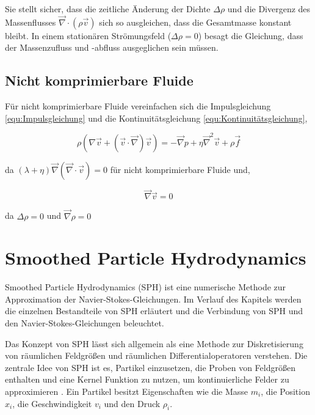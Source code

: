\documentclass[a4paper, 12pt]{article}
\begin{document}
Sie stellt sicher, dass die zeitliche Änderung der Dichte \(\Delta \rho\) und die Divergenz des Massenflusses \(\vec{\nabla} \cdot (\rho \vec{v})\) sich so ausgleichen, dass die Gesamtmasse konstant bleibt. In einem stationären Strömungsfeld (\(\Delta \rho = 0\)) besagt die Gleichung, dass der Massenzufluss und -abfluss ausgeglichen sein müssen.

\subsection{Nicht komprimierbare Fluide}
Für nicht komprimierbare Fluide vereinfachen sich die Impulsgleichung \eqref{equ:Impulsgleichung} und die Kontinuitätsgleichung \eqref{equ:Kontinuitätsgleichung},

\begin{equation} \label{equ:einfachImpulsgleichung}
	\rho(\nabla \vec{v} + (\vec{v} \cdot \vec{\nabla})\vec{v}) = - \vec{\nabla}p + \eta \vec{\nabla}^2 \vec{v} + \rho \vec{f}
\end{equation}

da \((\lambda + \eta)\vec{\nabla}(\vec{\nabla} \cdot \vec{v}) = 0\) für nicht komprimierbare Fluide und,

\begin{equation} \label{equ:einfachKontinuitätsgleichung}
	\vec{\nabla} \vec{v} = 0
\end{equation}

da \(\Delta \rho = 0\) und \(\vec{\nabla}\rho = 0\)

\section{Smoothed Particle Hydrodynamics} \label{Kap:SPH}
Smoothed Particle Hydrodynamics (SPH) ist eine numerische Methode zur Approximation der Navier-Stokes-Gleichungen. Im Verlauf des Kapitels werden die einzelnen Bestandteile von SPH erläutert und die Verbindung von SPH und den Navier-Stokes-Gleichungen beleuchtet.

Das Konzept von SPH lässt sich allgemein als eine Methode zur Diskretisierung von räumlichen Feldgrößen und räumlichen Differentialoperatoren verstehen. Die zentrale Idee von SPH ist es, Partikel einzusetzen, die Proben von Feldgrößen enthalten und eine Kernel Funktion zu nutzen, um kontinuierliche Felder zu approximieren \cite{huang2024journey}. Ein Partikel besitzt Eigenschaften wie die Masse \( m_i \), die Position \( x_i \), die Geschwindigkeit \( v_i \) und den Druck \( \rho_i \).
\end{document}
